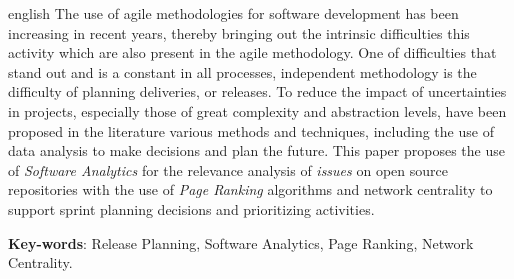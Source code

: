 \begin{resumo}[Abstract]
 \begin{otherlanguage*}{english}
  The use of agile methodologies for software development has been
  increasing in recent years, thereby bringing out the intrinsic difficulties
  this activity which are also present in the agile methodology. One of
  difficulties that stand out and is a constant in all processes, independent
  methodology is the difficulty of planning deliveries, or releases. To reduce the
  impact of uncertainties in projects, especially those of great complexity
  and abstraction levels, have been proposed in the literature various methods and techniques,
  including the use of data analysis to make decisions and plan the future.
  This paper proposes the use of \textit {Software Analytics} for the relevance 
  analysis of \textit{issues} on open source repositories with the use of
  \textit{Page Ranking} algorithms and network centrality to support sprint planning 
  decisions and prioritizing activities.
   \vspace{\onelineskip}
 
   \noindent 
   \textbf{Key-words}: Release Planning, Software Analytics, Page Ranking, Network Centrality.
 \end{otherlanguage*}
\end{resumo}
